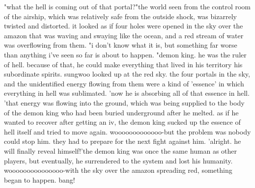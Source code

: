 "what the hell is coming out of that portal?"the world seen from the control room of the airship, which was relatively safe from the outside shock, was bizarrely twisted and distorted.
 it looked as if four holes were opened in the sky over the amazon that was waving and swaying like the ocean, and a red stream of water was overflowing from them.
"i don't know what it is, but something far worse than anything i've seen so far is about to happen.
"demon king.
 he was the ruler of hell.
 because of that, he could make everything that lived in his territory his subordinate spirits.
sungwoo looked up at the red sky.
 the four portals in the sky, and the unidentified energy flowing from them were a kind of 'essence' in which everything in hell was sublimated.
'now he is absorbing all of that essence in hell.
'that energy was flowing into the ground, which was being supplied to the body of the demon king who had been buried underground after he melted.
as if he wanted to recover after getting an iv, the demon king sucked up the essence of hell itself and tried to move again.
wooooooooooooo-but the problem was nobody could stop him.
 they had to prepare for the next fight against him.
 'alright.
 he will finally reveal himself!'the demon king was once the same human as other players, but eventually, he surrendered to the system and lost his humanity.
wooooooooooooooo-with the sky over the amazon spreading red, something began to happen.
bang!

 